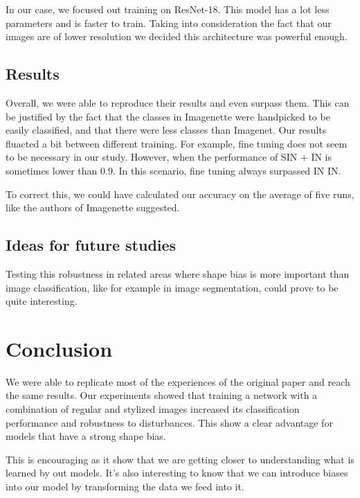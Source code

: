 \documentclass{article}
\begin{document}
\noindent
In our case, we focused out training on ResNet-18. This model has a lot less parameters and is faster to train. Taking into consideration the fact that our images are of lower resolution we decided this architecture was powerful enough.

\subsection{Results}

Overall, we were able to reproduce their results and
even surpass them. This can be justified by the fact that the classes
in Imagenette were handpicked to be easily classified, and that there were less 
classes than Imagenet.
Our results fluacted a bit between different training. For example, fine tuning does not seem to be necessary 
in our study. However, when the performance of SIN + IN is sometimes lower than 0.9. In this scenario, fine tuning
always surpassed IN \texorpdfstring{\textrightarrow} .IN. \medskip \par 

\noindent
To correct this, we could have calculated our accuracy on the average of five runs, like the authors of Imagenette \cite{fastai2019}
suggested.

\subsection{Ideas for future studies}

Testing this robustness in related areas where shape bias is more important than image classification, like for example in image segmentation, could prove to be quite interesting.

\section{Conclusion}

We were able to replicate most of the experiences of the original paper and reach the same results.
Our experiments showed that training a network with a combination of regular and stylized images increased its classification performance and robustness to disturbances.
This show a clear advantage for models that have a strong shape bias. \medskip \par

\noindent
This is encouraging as it show that we are getting closer to understanding what is learned by out models. 
It's also interesting to know that we can introduce biases into our model by transforming the data 
we feed into it.


\newpage
\appendix



\end{document}
